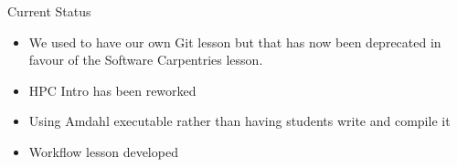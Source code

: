 \begin{frame}{Current Status}
	
	\begin{itemize}
		\item We used to have our own Git lesson but that has now been deprecated in favour of the Software Carpentries lesson.
		\item HPC Intro has been reworked
		\item Using Amdahl executable rather than having students write and compile it
		\item Workflow lesson developed
	\end{itemize}
	
	
\note{}
\end{frame}